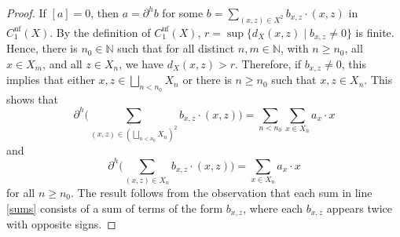 \documentclass[11pt]{amsart}
\newcommand{\N}{\mathbb{N}}
\numberwithin{equation}{section}
\newtheorem{theorem}{Theorem}[section]
\theoremstyle{definition}
\theoremstyle{remark}
\newcommand{\ri}{\partial}
\numberwithin{equation}{section}
\newcommand{\barh}{\partial^h}
\begin{document}
\begin{proof}
If $[a]=0$, then $a= \barh b$ for some $b=\sum_{(x,z)\in X^2}b_{x,z}\cdot (x,z)$ in $ C_1^{\textrm{uf}}(X)$. By the definition of $C_1^{\textrm{uf}}(X)$, $r= \sup\{d_X(x,z)\mid b_{x,z}\neq 0\}$ is finite. Hence, there is $n_0\in \N$ such that for all distinct $n,m\in\N$, with $n\geq n_0$, all $x\in X_m$, and all $z\in X_n$, we have $d_X(x,z)>r$. Therefore, if $b_{x,z}\neq 0$, this implies that either $x,z\in \bigsqcup_{n < n_0}X_n$ or there is $n\geq n_0$ such that $x,z\in X_n$. This shows that 
\[
 \barh\Bigg(\sum_{(x,z)\in(\bigsqcup_{n<n_0} X_n)^2}b_{x,z}\cdot(x,z)\Bigg)=\sum_{n<n_0}\sum_{x\in X_n}a_x\cdot x 
\]
and 
\[
 \barh \Bigg(\sum_{(x,z)\in X_n}b_{x,z}\cdot(x,z)\Bigg)=\sum_{x\in X_n}a_x\cdot x
\]
for all $n\geq n_0$. The result follows from the observation that each sum in line \eqref{sums} consists of a sum of terms of the form $b_{x,z}$, where each $b_{x,z}$ appears twice with opposite signs.
\end{proof}

 

\end{document}
